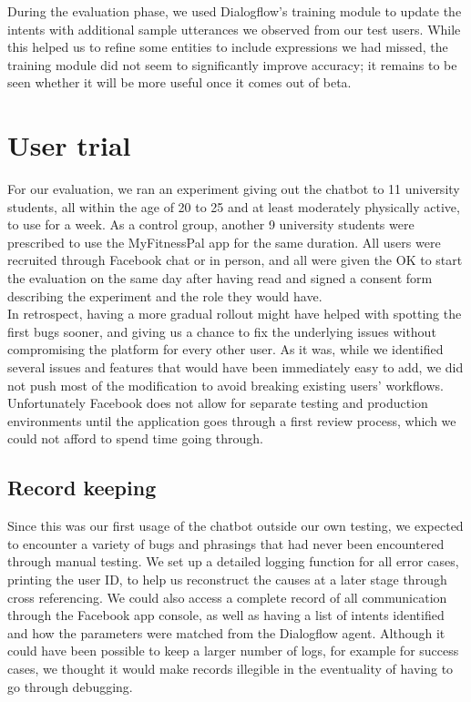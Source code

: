 During the evaluation phase, we used Dialogflow's training module to update the intents with additional sample utterances we observed from our test users. While this helped us to refine some entities to include expressions we had missed, the training module did not seem to significantly improve accuracy; it remains to be seen whether it will be more useful once it comes out of beta.
\section{User trial}
For our evaluation, we ran an experiment giving out the chatbot to 11 university students, all within the age of 20 to 25 and at least moderately physically active, to use for a week. As a control group, another 9 university students were prescribed to use the MyFitnessPal app for the same duration. All users were recruited through Facebook chat or in person, and all were given the OK to start the evaluation on the same day after having read and signed a consent form describing the experiment and the role they would have. \\
In retrospect, having a more gradual rollout might have helped with spotting the first bugs sooner, and giving us a chance to fix the underlying issues without compromising the platform for every other user. As it was, while we identified several issues and features that would have been immediately easy to add, we did not push most of the modification to avoid breaking existing users' workflows. Unfortunately Facebook does not allow for separate testing and production environments until the application goes through a first review process, which we could not afford to spend time going through.
\subsection{Record keeping}
Since this was our first usage of the chatbot outside our own testing, we expected to encounter a variety of bugs and phrasings that had never been encountered through manual testing. We set up a detailed logging function for all error cases, printing the user ID, to help us reconstruct the causes at a later stage through cross referencing. We could also access a complete record of all communication through the Facebook app console, as well as having a list of intents identified and how the parameters were matched from the Dialogflow agent. Although it could have been possible to keep a larger number of logs, for example for success cases, we thought it would make records illegible in the eventuality of having to go through debugging.

